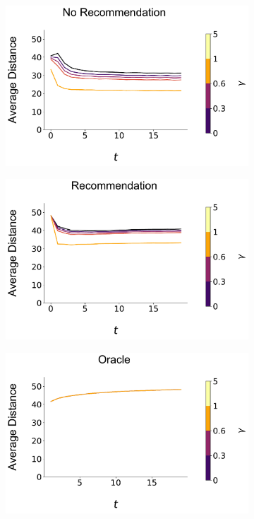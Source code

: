 \documentclass[sigconf]{acmart}
\begin{document}
\begin{figure}[t]
\begin{subfigure}{.25\linewidth}
\end{subfigure}\\
\begin{subfigure}{.25\linewidth}
\includegraphics[width=\linewidth]{figures/gamma_consumption_dist_N_200T_20.pdf}
\end{subfigure}
\begin{subfigure}{.25\linewidth}
\includegraphics[width=\linewidth]{figures/gamma_consumption_dist_N_200T_20_partial.pdf}
\end{subfigure}
\begin{subfigure}{.25\linewidth}
\includegraphics[width=\linewidth]{figures/gamma_consumption_dist_N_200T_20_omni.pdf}

\end{subfigure}
\end{figure}
\end{document}
